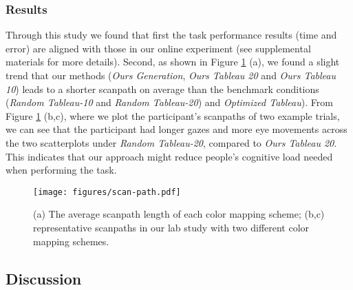 \subsubsection{Results}
%
Through this study we found that first the task performance results (time and error) are aligned with those in our online experiment (see supplemental materials for more details). Second, as shown in Figure \ref{fig:scanpath} (a), we found a slight trend that our methods (\emph{Ours Generation}, \emph{Ours Tableau 20} and \emph{Ours Tableau 10}) leads to a shorter scanpath on average than the benchmark conditions (\emph{Random Tableau-10} and \emph{Random Tableau-20}) and \emph{Optimized Tableau}). From Figure \ref{fig:scanpath} (b,c), where we plot the participant's scanpaths of two example trials, we can see that the participant had longer gazes and more eye movements across the two scatterplots under \emph{Random Tableau-20}, compared to \emph{Ours Tableau 20}. This indicates that our approach might reduce people's cognitive load needed when performing the task.

\begin{figure}[ht]
\centering
\texttt{[image: figures/scan-path.pdf]}
\caption{(a) The average scanpath length of each color mapping scheme; (b,c) representative scanpaths in our lab study with two different color mapping schemes. }
\vspace*{-3mm}
\label{fig:scanpath}
\end{figure}

\vspace{.3em}
\subsection{Discussion}

